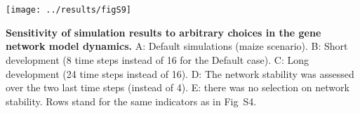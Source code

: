 \documentclass[10pt,a4paper]{article}
\begin{document}
\clearpage

\section{}

\begin{center}
\texttt{[image: ../results/figS9]}
\end{center}

\textbf{Sensitivity of simulation results to arbitrary choices in the gene network model dynamics.} A: Default simulations (maize scenario). B: Short development (8 time steps instead of 16 for the Default case). C: Long development (24 time steps instead of 16). D: The network stability was assessed over the two last time steps (instead of 4). E: there was no selection on network stability. Rows stand for the same indicators as in Fig\ S4. 
\end{document}
